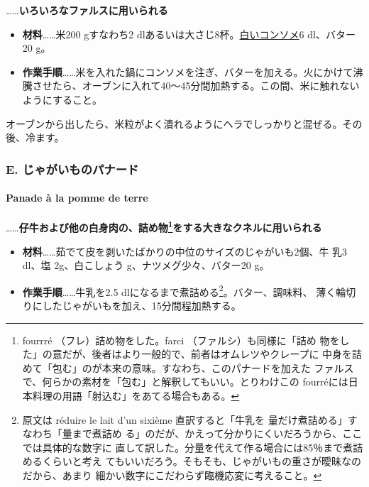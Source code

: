 \begin{recette}
\ldots{}\ldots{}\textbf{いろいろなファルスに用いられる}

\begin{itemize}
\item
  \textbf{材料}\ldots{}\ldots{}米200 gすなわち2
  dlあるいは大さじ8杯。\protect\hyperlink{}{白いコンソメ}6 dl、バター20
  g。
\item
  \textbf{作業手順}\ldots{}\ldots{}米を入れた鍋にコンソメを注ぎ、バターを加える。火にかけて沸騰させたら、オーブンに入れて40〜45分間加熱する。この間、米に触れないようにすること。
\end{itemize}

オーブンから出したら、米粒がよく潰れるようにヘラでしっかりと混ぜる。その後、冷ます。

\maeaki

\hypertarget{e.-ux3058ux3083ux304cux3044ux3082ux306eux30d1ux30caux30fcux30c9}{%
\subsubsection{E.
じゃがいものパナード}\label{e.-ux3058ux3083ux304cux3044ux3082ux306eux30d1ux30caux30fcux30c9}}

\hypertarget{panade-e}{%
\paragraph{Panade à la pomme de terre}\label{panade-e}}


\ldots{}\ldots{}\textbf{仔牛および他の白身肉の、詰め物\footnote{fourrré
  （フレ）詰め物をした。farci （ファルシ）も同様に「詰め
  物をした」の意だが、後者はより一般的で、前者はオムレツやクレープに
  中身を詰めて「包む」のが本来の意味。すなわち、このパナードを加えた
  ファルスで、何らかの素材を「包む」と解釈してもいい。とりわけこの
  fourréには日本料理の用語「射込む」をあてる場合もある。}をする大きなクネルに用いられる}

\begin{itemize}
\item
  \textbf{材料}\ldots{}\ldots{}茹でて皮を剥いたばかりの中位のサイズのじゃがいも2個、牛
  乳3 dl、塩 2g、白こしょう\undemi{} g、ナツメグ少々、バター20 g。
\item
  \textbf{作業手順}\ldots{}\ldots{}牛乳を2.5
  dlになるまで煮詰める\footnote{原文は réduire le lait d'un sixième
    直訳すると「牛乳を
    \unsixieme{}量だけ煮詰める」すなわち「\cinqsixiemes{}量まで煮詰め
    る」のだが、かえって分かりにくいだろうから、ここでは具体的な数字に
    直して訳した。分量を代えて作る場合には85％まで煮詰めるくらいと考え
    てもいいだろう。そもそも、じゃがいもの重さが曖昧なのだから、あまり
    細かい数字にこだわらず臨機応変に考えること。}。バター、調味料、
  薄く輪切りにしたじゃがいもを加え、15分間程加熱する。
\end{itemize}


\end{recette}
